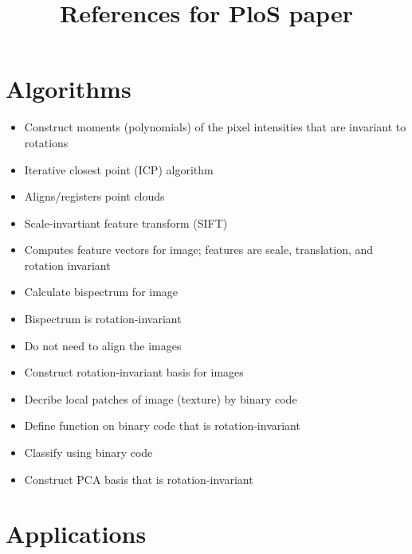 \documentclass[12pt]{article}
\title{References for PloS paper}
\begin{document}
\section{Algorithms}

\begin{itemize}
\item Construct moments (polynomials) of the pixel intensities that are invariant to rotations
\end{itemize}
%
\begin{itemize}
	\item Iterative closest point (ICP) algorithm
	\item Aligns/registers point clouds
\end{itemize}
%
\begin{itemize}
	\item Scale-invartiant feature transform (SIFT)
	\item Computes feature vectors for image; features are scale, translation, and rotation invariant
\end{itemize}
%
\begin{itemize}
	\item Calculate bispectrum for image
	\item Bispectrum is rotation-invariant
	\item Do not need to align the images
\end{itemize}
%
\begin{itemize}
	\item Construct rotation-invariant basis for images
\end{itemize}
%
\begin{itemize}
	\item Decribe local patches of image (texture) by binary code
	\item Define function on binary code that is rotation-invariant
	\item Classify using binary code
\end{itemize}
%
\begin{itemize}
	\item Construct PCA basis that is rotation-invariant
\end{itemize}


\section{Applications}
\end{document}

